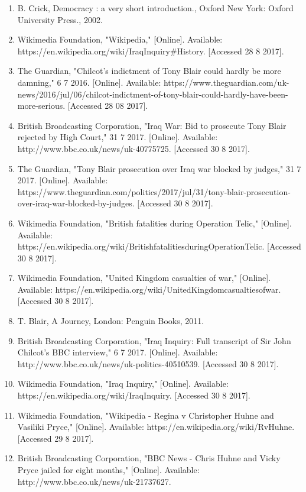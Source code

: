 \begin{enumerate}
	\item B. Crick, Democracy : a very short introduction., Oxford New York: Oxford University Press., 2002.
	\item Wikimedia Foundation, "Wikipedia," [Online]. Available: https://en.wikipedia.org/wiki/Iraq{\textunderscore}Inquiry{\#}History. [Accessed 28 8 2017].
	\item The Guardian, "Chilcot's indictment of Tony Blair could hardly be more damning," 6 7 2016. [Online]. Available: https://www.theguardian.com/uk-news/2016/jul/06/chilcot-indictment-of-tony-blair-could-hardly-have-been-more-serious. [Accessed 28 08 2017].
	\item British Broadcasting Corporation, "Iraq War: Bid to prosecute Tony Blair rejected by High Court," 31 7 2017. [Online]. Available: http://www.bbc.co.uk/news/uk-40775725. [Accessed 30 8 2017].
	\item The Guardian, "Tony Blair prosecution over Iraq war blocked by judges," 31 7 2017. [Online]. Available: https://www.theguardian.com/politics/2017/jul/31/tony-blair-prosecution-over-iraq-war-blocked-by-judges. [Accessed 30 8 2017].
	\item Wikimedia Foundation, "British fatalities during Operation Telic," [Online]. Available: https://en.wikipedia.org/wiki/British{\textunderscore}fatalities{\textunderscore}during{\textunderscore}Operation{\textunderscore}Telic. [Accessed 30 8 2017].
	\item Wikimedia Foundation, "United Kingdom casualties of war," [Online]. Available: https://en.wikipedia.org/wiki/United{\textunderscore}Kingdom{\textunderscore}casualties{\textunderscore}of{\textunderscore}war. [Accessed 30 8 2017].
	\item T. Blair, A Journey, London: Penguin Books, 2011.
	\item British Broadcasting Corporation, "Iraq Inquiry: Full transcript of Sir John Chilcot's BBC interview," 6 7 2017. [Online]. Available: http://www.bbc.co.uk/news/uk-politics-40510539. [Accessed 30 8 2017].
	\item Wikimedia Foundation, "Iraq Inquiry," [Online]. Available: https://en.wikipedia.org/wiki/Iraq{\textunderscore}Inquiry. [Accessed 30 8 2017].
	\item Wikimedia Foundation, "Wikipedia - Regina v Christopher Huhne and Vasiliki Pryce," [Online]. Available: https://en.wikipedia.org/wiki/R{\textunderscore}v{\textunderscore}Huhne. [Accessed 29 8 2017].
	\item British Broadcasting Corporation, "BBC News - Chris Huhne and Vicky Pryce jailed for eight months," [Online]. Available: http://www.bbc.co.uk/news/uk-21737627.

\end{enumerate}
